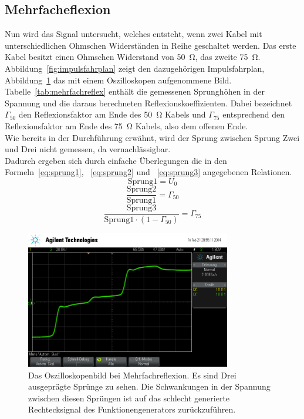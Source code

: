 \subsection{Mehrfacheflexion}
%
Nun wird das Signal untersucht, welches entsteht, wenn zwei 
Kabel mit unterschiedlichen Ohmschen Widerständen in Reihe geschaltet 
werden. Das erste Kabel besitzt einen Ohmschen Widerstand von 
\SI{50}{\ohm}, das zweite \SI{75}{\ohm}.\\
Abbildung~\ref{fig:impulsfahrplan} zeigt den dazugehörigen 
Impulsfahrplan, Abbildung~\ref{fig:mehrfachreflex} das mit einem 
Oszilloskopen aufgenommene Bild.\\
Tabelle~\ref{tab:mehrfachreflex} enthält die gemessenen Sprunghöhen 
in der Spannung und die daraus berechneten Reflexionskoeffizienten. 
Dabei bezeichnet $\Gamma_{50}$ den Reflexionsfaktor am Ende des 
\SI{50}{\ohm} Kabels und $\Gamma_{75}$ entsprechend den 
Reflexionsfaktor am Ende des \SI{75}{\ohm} Kabels, also dem offenen 
Ende.\\
Wie bereits in der Durchführung erwähnt, wird der Sprung zwischen 
Sprung Zwei und Drei nicht gemessen, da vernachlässigbar.\\
Dadurch ergeben sich durch einfache Überlegungen die in 
den Formeln~\eqref{eq:sprung1}, ~\eqref{eq:sprung2} 
und ~\eqref{eq:sprung3} angegebenen Relationen.
%
\begin{equation}
\text{Sprung1} = U_0
\label{eq:sprung1}
\end{equation}
%
\begin{equation}
\frac{\text{Sprung2}}{\text{Sprung1}} = \Gamma_{50}
\label{eq:sprung2}
\end{equation}
%
\begin{equation}
\frac{\text{Sprung3}}{\text{Sprung1}\cdot\left(1 - \Gamma_{50}\right)} = \Gamma_{75}
\label{eq:sprung3}
\end{equation}
%
\begin{figure}[]
\centering
\includegraphics[width=0.8\textwidth]{reflex.png}
\caption{Das Oszilloskopenbild bei Mehrfachreflexion. Es sind 
Drei ausgeprägte Sprünge zu sehen. Die Schwankungen in der Spannung 
zwischen diesen Sprüngen ist auf das schlecht generierte 
Rechtecksignal des Funktionengenerators zurückzuführen.}
\label{fig:mehrfachreflex}
\end{figure}

